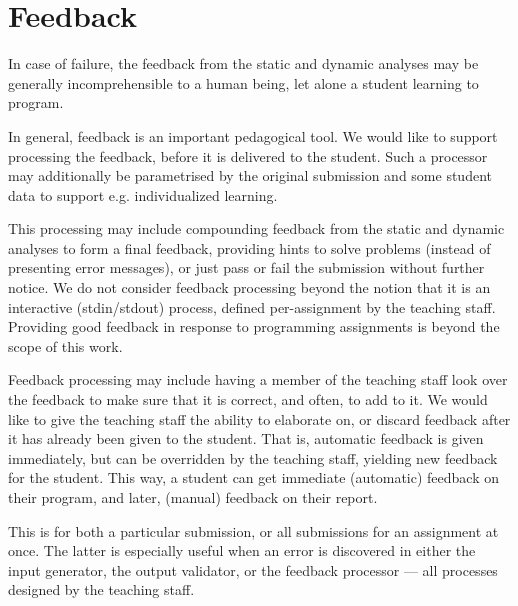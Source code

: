 
\section{Feedback}

In case of failure, the feedback from the static and dynamic analyses may be
generally incomprehensible to a human being\cite{lerner-et-al-2007}, let alone
a student learning to program\cite{mccauley-et-al-2008}.

In general, feedback is an important pedagogical tool. We would like to support
processing the feedback, before it is delivered to the student. Such a
processor may additionally be parametrised by the original submission and some
student data to support e.g. individualized learning.

This processing may include compounding feedback from the static and dynamic
analyses to form a final feedback, providing hints to solve problems (instead
of presenting error messages), or just pass or fail the submission without
further notice. We do not consider feedback processing beyond the notion that
it is an interactive (stdin/stdout) process, defined per-assignment by the
teaching staff. Providing good feedback in response to programming assignments
is beyond the scope of this work.

Feedback processing may include having a member of the teaching staff look over
the feedback to make sure that it is correct, and often, to add to it. We would
like to give the teaching staff the ability to elaborate on, or discard
feedback after it has already been given to the student. That is, automatic
feedback is given immediately, but can be overridden by the teaching staff,
yielding new feedback for the student. This way, a student can get immediate
(automatic) feedback on their program, and later, (manual) feedback on their
report.

This is for both a particular submission, or all submissions for an assignment
at once. The latter is especially useful when an error is discovered in either
the input generator, the output validator, or the feedback processor ---
all processes designed by the teaching staff.
